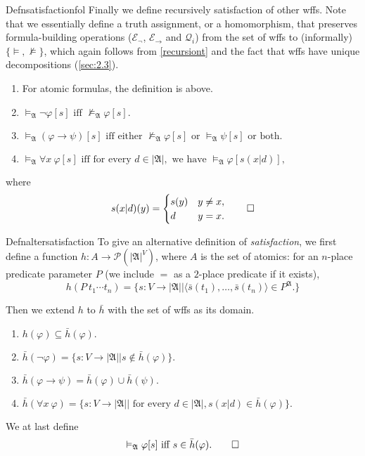\begin{reference}{Defn}{satisfactionfol}
  Finally we define recursively satisfaction of other wffs. Note that we essentially define a truth assignment, or a homomorphism, that preserves formula-building operations ($\mathcal{E}_{\neg}$, $\mathcal{E}_{\rightarrow}$ and $\mathcal{Q}_i$) from the set of wffs to (informally) $\{\vDash,\nvDash\}$, which again follows from \ref{recursiont} and the fact that wffs have unique decompositions (\ref{sec:2.3}).
  \begin{enumerate}
    \item For atomic formulas, the definition is above.
    \item $\vDash_{\mathfrak{A}}\neg\varphi[s]\text{ iff }\nvDash_{\mathfrak{A}}\varphi[s].$
    \item $\vDash_{\mathfrak{A}}(\varphi\rightarrow \psi)[s]\text{ iff either }\nvDash_{\mathfrak{A}}\varphi[s]\text{ or }\vDash_{\mathfrak{A}}\psi[s]\text{ or both.}$
    \item $\vDash_{\mathfrak{A}}\forall x\ \varphi[s]\text{ iff for every }d\in|\mathfrak{A}|,\text{ we have }\vDash_{\mathfrak{A}}\varphi[s(x|d)],$
  \end{enumerate}
  where
  \[
    s(x|d)(y)=\begin{cases}
      s(y) & y\neq x, \\
      d    & y=x.
    \end{cases}\qedhere
  \]
\end{reference}

\begin{reference}{Defn}{altersatisfaction}
  To give an alternative definition of \textit{satisfaction}, we first define a function $h: A\rightarrow \mathcal{P}(|\mathfrak{A}|^V)$, where $A$ is the set of atomics: for an $n$-place predicate parameter $P$ (we include $=$ as a $2$-place predicate if it exists),
  \[
    h(P\ t_1\cdots t_n)=\{s: V\rightarrow|\mathfrak{A}||\langle\bar{s}(t_1),\dots,\bar{s}(t_n)\rangle\in P^{\mathfrak{A}}.\}
  \]

  Then we extend $h$ to $\bar{h}$ with the set of wffs as its domain.
  \begin{enumerate}
    \item $h(\varphi)\subseteq\bar{h}(\varphi).$
    \item $\bar{h}(\neg \varphi)=\{s: V\rightarrow|\mathfrak{A}||s\notin\bar{h}(\varphi)\}.$
    \item $\bar{h}(\varphi\rightarrow \psi)=\bar{h}(\varphi)\cup\bar{h}(\psi).$
    \item $\bar{h}(\forall x\ \varphi)=\{s: V\rightarrow|\mathfrak{A}||\text{ for every }d\in|\mathfrak{A}|, s(x|d)\in\bar{h}(\varphi)\}.$
  \end{enumerate}
  We at last define
  \[
    \vDash_{\mathfrak{A}}\varphi[s]\text{ iff }s\in\bar{h}(\varphi).\qedhere
  \]
\end{reference}

